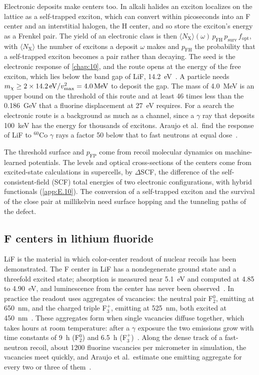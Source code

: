 Electronic deposits make centers too. In alkali halides an exciton localizes on the lattice as a self-trapped exciton, which can convert within picoseconds into an F center and an interstitial halogen, the H center, and so store the exciton's energy as a Frenkel pair. The yield of an electronic class is then $\langle N_{\mathrm{X}}\rangle(\omega)\,p_{\mathrm{FH}}\,p_{\mathrm{surv}}\,f_{\mathrm{opt}}$, with $\langle N_{\mathrm{X}}\rangle$ the number of excitons a deposit $\omega$ makes and $p_{\mathrm{FH}}$ the probability that a self-trapped exciton becomes a pair rather than decaying. The seed is the electronic response of \cref{chap:10}, and the route opens at the energy of the free exciton, which lies below the band gap of LiF, \SI{14.2}{eV}~\cite{guerreroperez2025first}. A particle needs $m_{\chi} \ge 2\times\SI{14.2}{eV}/v_{\mathrm{max}}^2 = \SI{4.0}{MeV}$ to deposit the gap. The mass of \SI{4.0}{MeV} is an upper bound on the threshold of this route and at least 46 times less than the \SI{0.186}{GeV} that a fluorine displacement at \SI{27}{eV} requires. For a search the electronic route is a background as much as a channel, since a $\gamma$ ray that deposits \SI{100}{keV} has the energy for thousands of excitons. Araujo et al.\ find the response of LiF to $^{60}$Co $\gamma$ rays a factor 50 below that to fast neutrons at equal dose~\cite[Sect.~III]{araujo2026nuclear}.

The threshold surface and $p_{\mathrm{FP}}$ come from recoil molecular dynamics on machine-learned potentials. The levels and optical cross-sections of the centers come from excited-state calculations in supercells, by $\Delta$SCF, the difference of the self-consistent-field (SCF) total energies of two electronic configurations, with hybrid functionals (\cref{app:E.10}). The conversion of a self-trapped exciton and the survival of the close pair at millikelvin need surface hopping and the tunneling paths of the defect.

\subsection{F centers in lithium fluoride}\label{sec:16.6-lif}

LiF is the material in which color-center readout of nuclear recoils has been demonstrated. The F center in LiF has a nondegenerate ground state and a threefold excited state; absorption is measured near \SI{5.1}{eV} and computed at 4.85 to \SI{4.90}{eV}, and luminescence from the center has never been observed~\cite{guerreroperez2025first}. In practice the readout uses aggregates of vacancies: the neutral pair F$_2^0$, emitting at \SI{650}{nm}, and the charged triple F$_3^+$, emitting at \SI{525}{nm}, both excited at \SI{450}{nm}~\cite[Sect.~I]{araujo2026nuclear}. These aggregates form when single vacancies diffuse together, which takes hours at room temperature: after a $\gamma$ exposure the two emissions grow with time constants of \SI{9}{h} (F$_2^0$) and \SI{6.5}{h} (F$_3^+$)~\cite[Sect.~III]{araujo2026nuclear}. Along the dense track of a fast-neutron recoil, about 1200 fluorine vacancies per micrometer in simulation, the vacancies meet quickly, and Araujo et al.\ estimate one emitting aggregate for every two or three of them~\cite[Sect.~II]{araujo2026nuclear}.

